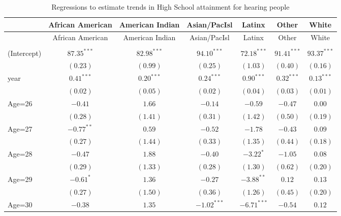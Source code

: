 \documentclass[fullpage]{paper}
\begin{document}
\begin{center}
\begin{longtable}{l c c c c c c }
\hline
 & African American & American Indian & Asian/PacIsl & Latinx & Other & White \\
\hline
\endfirsthead
\hline
 & African American & American Indian & Asian/PacIsl & Latinx & Other & White \\
\hline
\endhead
\hline
\endfoot
\hline
\multicolumn{7}{l}{\scriptsize{$^{***}p<0.001$, $^{**}p<0.01$, $^*p<0.05$}}\\
\caption{Regressions to estimate trends in High School attainment for hearing people}
\label{table:coefficients}
\endlastfoot
(Intercept) & $87.35^{***}$ & $82.98^{***}$ & $94.10^{***}$  & $72.18^{***}$  & $91.41^{***}$ & $93.37^{***}$ \\
            & $(0.23)$      & $(0.99)$      & $(0.25)$       & $(1.03)$       & $(0.40)$      & $(0.16)$      \\
year        & $0.41^{***}$  & $0.20^{***}$  & $0.24^{***}$   & $0.90^{***}$   & $0.32^{***}$  & $0.13^{***}$  \\
            & $(0.02)$      & $(0.05)$      & $(0.02)$       & $(0.04)$       & $(0.03)$      & $(0.01)$      \\
Age=26      & $-0.41$       & $1.66$        & $-0.14$        & $-0.59$        & $-0.47$       & $0.00$        \\
            & $(0.28)$      & $(1.41)$      & $(0.31)$       & $(1.42)$       & $(0.50)$      & $(0.19)$      \\
Age=27      & $-0.77^{**}$  & $0.59$        & $-0.52$        & $-1.78$        & $-0.43$       & $0.09$        \\
            & $(0.27)$      & $(1.44)$      & $(0.33)$       & $(1.35)$       & $(0.44)$      & $(0.18)$      \\
Age=28      & $-0.47$       & $1.88$        & $-0.40$        & $-3.22^{*}$    & $-1.05$       & $0.08$        \\
            & $(0.29)$      & $(1.33)$      & $(0.28)$       & $(1.30)$       & $(0.62)$      & $(0.20)$      \\
Age=29      & $-0.61^{*}$   & $1.36$        & $-0.27$        & $-3.88^{**}$   & $0.12$        & $0.13$        \\
            & $(0.27)$      & $(1.50)$      & $(0.36)$       & $(1.26)$       & $(0.45)$      & $(0.20)$      \\
Age=30      & $-0.38$       & $1.35$        & $-1.02^{***}$  & $-6.71^{***}$  & $-0.54$       & $0.12$        \\

\end{longtable}
\end{center}
\end{document}
